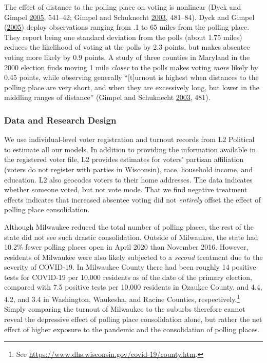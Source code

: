 \documentclass[
  12pt,
]{article}
\begin{document}
The effect of distance to the polling place on voting is nonlinear (Dyck and Gimpel \protect\hyperlink{ref-Dyck2005}{2005}, 541--42; Gimpel and Schuknecht \protect\hyperlink{ref-Gimpel2003}{2003}, 481--84). Dyck and Gimpel (\protect\hyperlink{ref-Dyck2005}{2005}) deploy observations ranging from .1 to 65 miles from the polling place. They report being one standard deviation from the polls (about 1.75 miles) reduces the likelihood of voting at the polls by 2.3 points, but makes absentee voting more likely by 0.9 points. A study of three counties in Maryland in the 2000 election finds moving 1 mile \emph{closer} to the polls makes voting \emph{more} likely by 0.45 points, while observing generally ``{[}t{]}urnout is highest when distances to the polling place are very short, and when they are excessively long, but lower in the middling ranges of distance'' (Gimpel and Schuknecht \protect\hyperlink{ref-Gimpel2003}{2003}, 481).

\hypertarget{data-and-research-design}{%
\subsubsection*{Data and Research Design}\label{data-and-research-design}}

We use individual-level voter registration and turnout records from L2 Political to estimate all our models. In addition to providing the information available in the registered voter file, L2 provides estimates for voters' partisan affiliation (voters do not register with parties in Wisconsin), race, household income, and education. L2 also geocodes voters to their home addresses. The data indicates whether someone voted, but not vote mode. That we find negative treatment effects indicates that increased absentee voting did not \emph{entirely} offset the effect of polling place consolidation.

Although Milwaukee reduced the total number of polling places, the rest of the state did not see such drastic consolidation. Outside of Milwaukee, the state had 10.2\% fewer polling places open in April 2020 than November 2016. However, residents of Milwaukee were also likely subjected to a \emph{second} treatment due to the severity of COVID-19. In Milwaukee County there had been roughly 14 positive tests for COVID-19 per 10,000 residents as of the date of the primary election, compared with 7.5 positive tests per 10,000 residents in Ozaukee County, and 4.4, 4.2, and 3.4 in Washington, Waukesha, and Racine Counties, respectively.\footnote{See \url{https://www.dhs.wisconsin.gov/covid-19/county.htm}.} Simply comparing the turnout of Milwaukee to the suburbs therefore cannot reveal the depressive effect of polling place consolidation alone, but rather the net effect of higher exposure to the pandemic and the consolidation of polling places.
\end{document}
